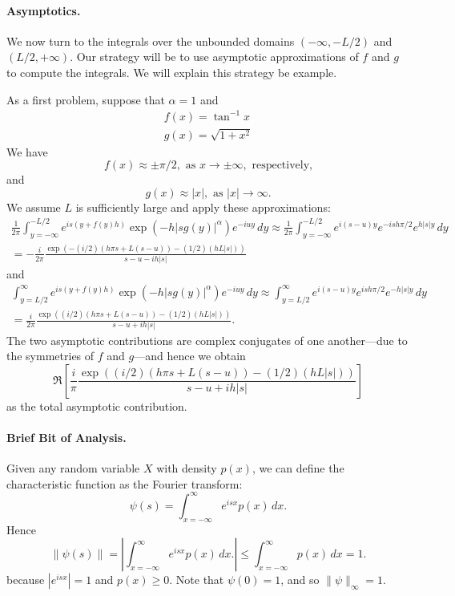\documentclass[11pt,letterpaper]{article}
\begin{document}
\paragraph{Asymptotics.} We now turn to the integrals over the unbounded domains $(-\infty, -L/2)$ and $(L/2, +\infty)$. Our strategy will be to use asymptotic approximations of $f$ and $g$ to compute the integrals. We will explain this strategy be example.

As a first problem, suppose that $\alpha = 1$ and
\begin{gather*}
f(x) = \tan^{-1} x \\
g(x) = \sqrt{1 + x^2}
\end{gather*}
We have
\[
f(x) \approx \pm \pi/2, \text{ as } x \to \pm \infty, \text{ respectively,}
\]
and
\[
g(x) \approx |x|, \text{ as } |x| \to \infty.
\]
We assume $L$ is sufficiently large and apply these approximations:
\begin{multline*}
\frac{1}{2 \pi} \int_{y=-\infty}^{-L/2} e^{is\left(y+f(y)h\right)}\exp{\left(  -h |s g(y)|^{\alpha} \right)}e^{-iuy}\, dy \approx \frac{1}{2 \pi} \int_{y=-\infty}^{-L/2} e^{i(s-u)y} e^{-i s h \pi/2} e^{h |s| y} \, dy \\
 = - \frac{i}{2 \pi} \frac{\exp \left( - (i/2)(h \pi s + L(s-u)) - (1/2)(h L |s|) \right)}{s - u - i h |s|}
\end{multline*}
and
\begin{multline*}
\int_{y=L/2}^{\infty} e^{is\left(y+f(y)h\right)}\exp{\left(  -h |s g(y)|^{\alpha} \right)}e^{-iuy}\, dy \approx \int_{y=L/2}^{\infty} e^{i(s-u)y} e^{i s h \pi/2} e^{-h |s| y} \, dy \\
 = \frac{i}{2 \pi} \frac{\exp \left( (i/2)(h \pi s + L(s-u)) - (1/2)(h L |s|) \right)}{s - u + i h |s|}.
\end{multline*}
The two asymptotic contributions are complex conjugates of one another---due to the symmetries of $f$ and $g$---and hence we obtain
\begin{equation}
\label{eqn:asympcalc}
\Re \left[ \frac{i}{\pi} \frac{\exp \left( (i/2)(h \pi s + L(s-u)) - (1/2)(h L |s|) \right)}{s - u + i h |s|} \right]
\end{equation}
as the total asymptotic contribution.

\paragraph{Brief Bit of Analysis.} Given any random variable $X$ with density $p(x)$, we can define the characteristic function as the Fourier transform:
\[
\psi(s) = \int_{x=-\infty}^\infty e^{i s x} p(x) \, dx.
\]
Hence
\[
\| \psi(s) \| = \left| \int_{x=-\infty}^\infty e^{i s x} p(x) \, dx. \right| \leq \int_{x=-\infty}^\infty p(x) \, dx = 1.
\]
because $|e^{i s x}| = 1$ and $p(x) \geq 0$.  Note that $\psi(0) = 1$, and so $\|\psi \|_\infty = 1$.
\end{document}
